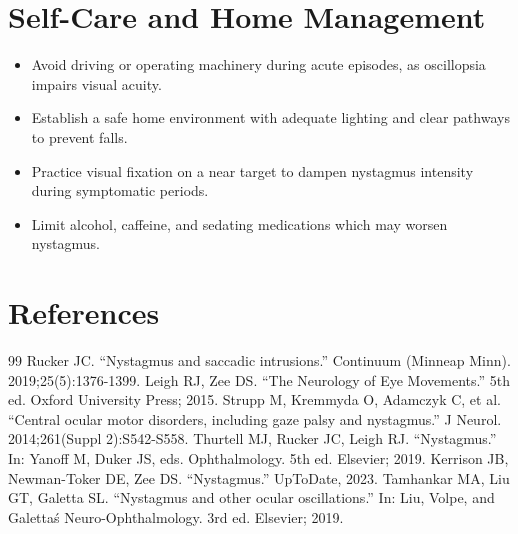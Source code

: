 \section*{Self-Care and Home Management}
\begin{itemize}
  \item Avoid driving or operating machinery during acute episodes, as oscillopsia impairs visual acuity.
  \item Establish a safe home environment with adequate lighting and clear pathways to prevent falls.
  \item Practice visual fixation on a near target to dampen nystagmus intensity during symptomatic periods.
  \item Limit alcohol, caffeine, and sedating medications which may worsen nystagmus.
\end{itemize}

\section*{References}
\begin{thebibliography}{99}
 Rucker JC. ``Nystagmus and saccadic intrusions.'' Continuum (Minneap Minn). 2019;25(5):1376-1399.
 Leigh RJ, Zee DS. ``The Neurology of Eye Movements.'' 5th ed. Oxford University Press; 2015.
 Strupp M, Kremmyda O, Adamczyk C, et al. ``Central ocular motor disorders, including gaze palsy and nystagmus.'' J Neurol. 2014;261(Suppl 2):S542-S558.
 Thurtell MJ, Rucker JC, Leigh RJ. ``Nystagmus.'' In: Yanoff M, Duker JS, eds. Ophthalmology. 5th ed. Elsevier; 2019.
 Kerrison JB, Newman-Toker DE, Zee DS. ``Nystagmus.'' UpToDate, 2023.
 Tamhankar MA, Liu GT, Galetta SL. ``Nystagmus and other ocular oscillations.'' In: Liu, Volpe, and Galetta\'s Neuro-Ophthalmology. 3rd ed. Elsevier; 2019.
\end{thebibliography}

